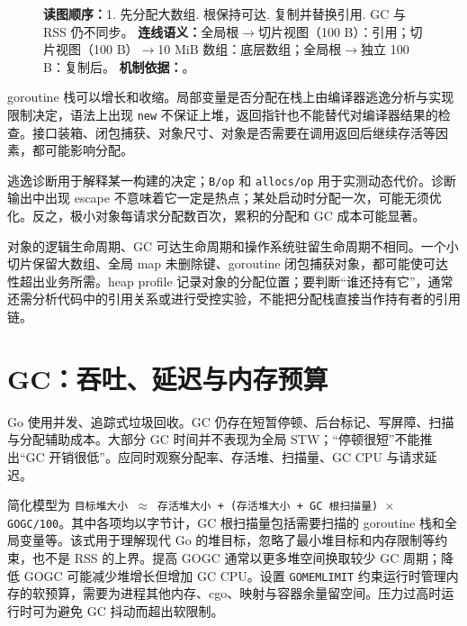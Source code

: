 \documentclass[UTF8,fontset=fandol,openany,11pt]{ctexbook}
\begin{document}
\begin{figure}[H]
\begin{minipage}{0.96\linewidth}
\textbf{读图顺序：}1. 先分配大数组. 根保持可达. 复制并替换引用. GC 与 RSS 仍不同步。
\textbf{连线语义：}全局根\ensuremath{\rightarrow}\allowbreak{}切片视图（100 B）：引用；切片视图（100 B）\ensuremath{\rightarrow}\allowbreak{}10 MiB 数组：底层数组；全局根\ensuremath{\rightarrow}\allowbreak{}独立 100 B：复制后。
\textbf{机制依据：}\cite{go-memory}。
\end{minipage}
\end{figure}
goroutine 栈可以增长和收缩。局部变量是否分配在栈上由编译器逃逸分析与实现限制决定，语法上出现 \texttt{new} 不保证上堆，返回指针也不能替代对编译器结果的检查。接口装箱、闭包捕获、对象尺寸、对象是否需要在调用返回后继续存活等因素，都可能影响分配。


逃逸诊断用于解释某一构建的决定；\texttt{B/\allowbreak{}op} 和 \texttt{allocs/\allowbreak{}op} 用于实测动态代价。诊断输出中出现 escape 不意味着它一定是热点；某处启动时分配一次，可能无须优化。反之，极小对象每请求分配数百次，累积的分配和 GC 成本可能显著。

对象的逻辑生命周期、GC 可达生命周期和操作系统驻留生命周期不相同。一个小切片保留大数组、全局 map 未删除键、goroutine 闭包捕获对象，都可能使可达性超出业务所需。heap profile 记录对象的分配位置；要判断“谁还持有它”，通常还需分析代码中的引用关系或进行受控实验，不能把分配栈直接当作持有者的引用链。

\section{GC：吞吐、延迟与内存预算}
Go 使用并发、追踪式垃圾回收。GC 仍存在短暂停顿、后台标记、写屏障、扫描与分配辅助成本。大部分 GC 时间并不表现为全局 STW；“停顿很短”不能推出“GC 开销很低”。应同时观察分配率、存活堆、扫描量、GC CPU 与请求延迟。\cite{go-memory}

简化模型为 \texttt{目标堆大小 \ensuremath{\approx} 存活堆大小 + (存活堆大小 + GC 根扫描量) \ensuremath{\times} GOGC/\allowbreak{}100}。其中各项均以字节计，GC 根扫描量包括需要扫描的 goroutine 栈和全局变量等。该式用于理解现代 Go 的堆目标，忽略了最小堆目标和内存限制等约束，也不是 RSS 的上界。提高 GOGC 通常以更多堆空间换取较少 GC 周期；降低 GOGC 可能减少堆增长但增加 GC CPU。设置 \texttt{GOMEMLIMIT} 约束运行时管理内存的软预算，需要为进程其他内存、cgo、映射与容器余量留空间。压力过高时运行时可为避免 GC 抖动而超出软限制。
\end{document}
